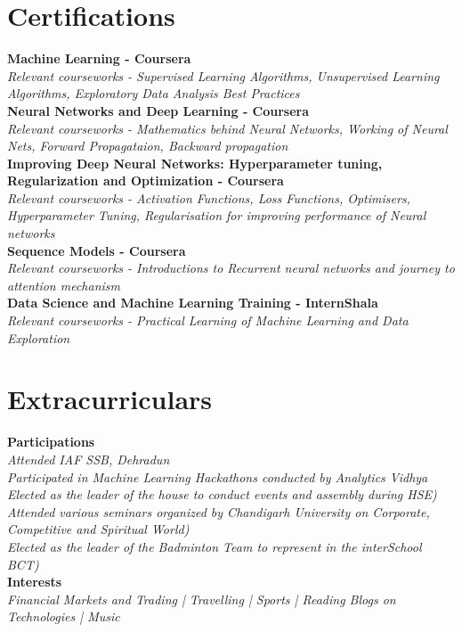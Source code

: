 \documentclass[letterpaper,11pt]{article}
\begin{document}
\section{Certifications}
  \begin{itemize}[leftmargin=0.15in, label={}]
    \small{\item{
     \textbf{Machine Learning - Coursera} \\
     \textit{Relevant courseworks - Supervised Learning Algorithms, Unsupervised Learning Algorithms, Exploratory Data Analysis Best Practices} \\
     \textbf{Neural Networks and Deep Learning - Coursera} \\
     \textit{Relevant courseworks - Mathematics behind Neural Networks, Working of Neural Nets, Forward Propagataion, Backward propagation} \\
     \textbf{Improving Deep Neural Networks: Hyperparameter tuning, Regularization and Optimization - Coursera} \\
     \textit{Relevant courseworks - Activation Functions, Loss Functions, Optimisers, Hyperparameter Tuning, Regularisation for improving performance of Neural networks} \\
     \textbf{Sequence Models - Coursera} \\
     \textit{Relevant courseworks - Introductions to Recurrent neural networks and journey to attention mechanism} \\
     \textbf{Data Science and Machine Learning Training - InternShala} \\
     \textit{Relevant courseworks - Practical Learning of Machine Learning and Data Exploration} \\
    }}
 \end{itemize}


 \section{Extracurriculars}
  \begin{itemize}[leftmargin=0.15in, label={}]
    \small{\item{
     \textbf{Participations} \\
     \textit{Attended IAF SSB, Dehradun}\\
     \textit{Participated in Machine Learning Hackathons conducted by Analytics Vidhya}\\
     \textit{Elected as the leader of the house to conduct events and assembly during HSE)}\\
     \textit{Attended various seminars organized by Chandigarh University on Corporate, Competitive and Spiritual World)} \\
     \textit{Elected as the leader of the Badminton Team to represent in the interSchool BCT)}\\
     \textbf{Interests} \\
     \textit{Financial Markets and Trading | Travelling | Sports | Reading Blogs on Technologies | Music}\\
    }}
 \end{itemize}


\end{document}
